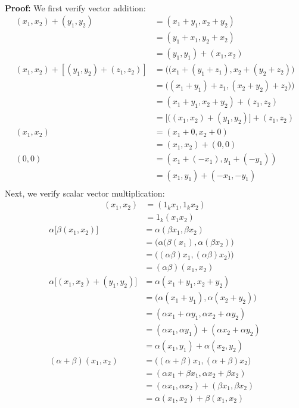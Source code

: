 \documentclass{homework}
\begin{document}
\\
\textbf{Proof: } We first verify vector addition:
\\
\begin{align*}
    ({x_1},{x_2})+({y_1},{y_2})&=({x_1}+{y_1},{x_2}+{y_2})\\
    &= ({y_1}+{x_1},{y_2}+{x_2})\\
    &= ({y_1},{y_1})+({x_1},{x_2})\\
    ({x_1},{x_2})+[({y_1},{y_2})+({z_1},{z_2})]&=\Big(({x_1}+({y_1}+{z_1}),{x_2}+({y_2}+{z_2})\Big)\\
    &=\Big(({x_1}+{y_1})+{z_1},({x_2}+{y_2})+{z_2})\Big)\\
    &=({x_1}+{y_1},{x_2}+{y_2})+({z_1},{z_2})\\
    &=\Big[(({x_1},{x_2})+({y_1},{y_2})\Big]+({z_1},{z_2})\\
    ({x_1},{x_2})&=({x_1}+0,{x_2}+0)\\
    &=({x_1},{x_2})+(0,0)\\
    (0,0)&=({x_1}+({-x_1}),{y_1}+(-{y_1}))\\
    &=({x_1},{y_1})+(-{x_1},-{y_1})\\
\end{align*}
Next, we verify scalar vector multiplication:
\begin{align*}
    ({x_1},{x_2})&=({1_k}{x_1},{1_k}{x_2})\\
    &={1_k}({x_1}{x_2})
\end{align*}
\begin{align*}
    \alpha\Big[\beta({x_1},{x_2})\Big]&=\alpha(\beta{x_1},\beta{x_2})\\
    &=\Big(\alpha(\beta({x_1}),\alpha(\beta{x_2})\Big)\\
    &=\Big((\alpha\beta){x_1},(\alpha\beta){x_2})\Big)\\
    &=(\alpha\beta)({x_1},{x_2})\\
    \alpha\Big[({x_1},{x_2})+({y_1,y_2})\Big]&=\alpha({x_1}+{y_1},{x_2}+{y_2})\\
    &=\Big(\alpha({x_1}+{y_1}),\alpha({x_2}+{y_2})\Big)\\
    &=(\alpha{x_1}+\alpha{y_1},\alpha{x_2}+\alpha{y_2})\\
    &=(\alpha{x_1},\alpha{y_1})+(\alpha{x_2}+\alpha{y_2})\\
    &=\alpha({x_1},{y_1})+\alpha({x_2},{y_2})\\
    (\alpha+\beta)({x_1,x_2})&=\Big((\alpha+\beta){x_1},(\alpha+\beta){x_2}\Big)\\
    &=(\alpha{x_1}+\beta{x_1},\alpha{x_2}+\beta{x_2})\\
    &=(\alpha{x_1},\alpha{x_2})+(\beta{x_1},\beta{x_2})\\
    &=\alpha({x_1},{x_2})+\beta({x_1},{x_2})\\
\end{align*}
\end{document}
